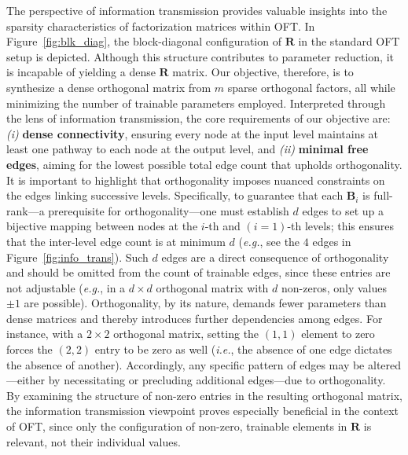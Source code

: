 The perspective of information transmission provides valuable insights into the sparsity characteristics of factorization matrices within OFT. In Figure~\ref{fig:blk_diag}, the block-diagonal configuration of $\bm{R}$ in the standard OFT setup is depicted. Although this structure contributes to parameter reduction, it is incapable of yielding a dense $\bm{R}$ matrix. Our objective, therefore, is to synthesize a dense orthogonal matrix from $m$ sparse orthogonal factors, all while minimizing the number of trainable parameters employed. Interpreted through the lens of information transmission, the core requirements of our objective are: \emph{(i)} \textbf{dense connectivity}, ensuring every node at the input level maintains at least one pathway to each node at the output level, and \emph{(ii)} \textbf{minimal free edges}, aiming for the lowest possible total edge count that upholds orthogonality. It is important to highlight that orthogonality imposes nuanced constraints on the edges linking successive levels. Specifically, to guarantee that each $\bm{B}_i$ is full-rank—a prerequisite for orthogonality—one must establish $d$ edges to set up a bijective mapping between nodes at the $i$-th and $(i=1)$-th levels; this ensures that the inter-level edge count is at minimum $d$ (\emph{e.g.}, see the $4$ edges in Figure~\ref{fig:info_trans}). Such $d$ edges are a direct consequence of orthogonality and should be omitted from the count of trainable edges, since these entries are not adjustable (\emph{e.g.}, in a $d \times d$ orthogonal matrix with $d$ non-zeros, only values $\pm 1$ are possible). Orthogonality, by its nature, demands fewer parameters than dense matrices and thereby introduces further dependencies among edges. For instance, with a $2 \times 2$ orthogonal matrix, setting the $(1,1)$ element to zero forces the $(2,2)$ entry to be zero as well (\emph{i.e.}, the absence of one edge dictates the absence of another). Accordingly, any specific pattern of edges may be altered—either by necessitating or precluding additional edges—due to orthogonality. By examining the structure of non-zero entries in the resulting orthogonal matrix, the information transmission viewpoint proves especially beneficial in the context of OFT, since only the configuration of non-zero, trainable elements in $\bm{R}$ is relevant, not their individual values.

